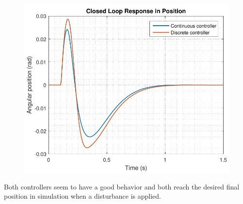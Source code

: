 \hspace{0.03\linewidth}
\begin{minipage}{0.45\linewidth}
    \begin{figure}[H]\vspace{-4mm}
      \includegraphics[scale=.5]{figures/positionComp}
      \captionsetup{justification=centering}
      \label{discreteVsContinuousSimulation}
    \end{figure}\vspace{-5mm}
\end{minipage}

Both controllers seem to have a good behavior and both reach the desired final position in simulation when a disturbance is applied. 

